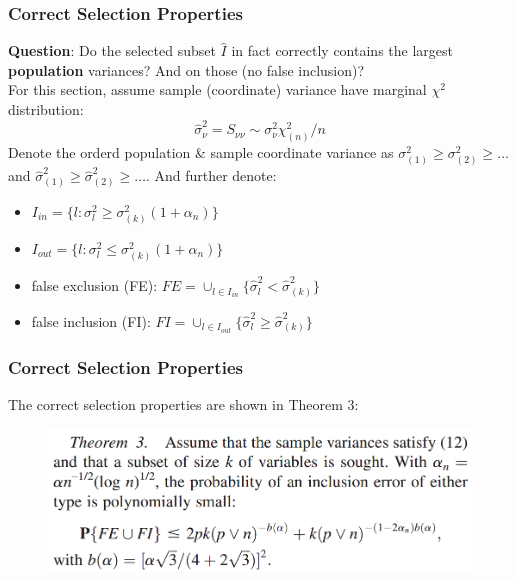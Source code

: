 \documentclass{beamer}
\begin{document}
	\begin{frame}
		\frametitle{Correct Selection Properties}
		\textbf{Question}: Do the selected subset $\hat{I}$ in fact correctly contains the largest \textbf{population} variances? And on those (no false inclusion)?\\
		For this section, assume sample (coordinate) variance have marginal $\chi^2$ distribution:
		$$\hat{\sigma}^2_{\nu} = S_{\nu\nu}\sim \sigma^2_{\nu}\chi^2_{(n)}/n$$
		Denote the orderd population \& sample coordinate variance as $\sigma^2_{(1)}\geq \sigma^2_{(2)}\geq\ldots$ and $\hat{\sigma}^2_{(1)}\geq \hat{\sigma}^2_{(2)}\geq\ldots$. And further denote:
		\begin{itemize}
			\item
			$I_{in} = \{l:\sigma^2_l \geq \sigma^2_{(k)}(1+\alpha_n)\}$
			\item
			$I_{out} = \{l:\sigma^2_l \leq \sigma^2_{(k)}(1+\alpha_n)\}$
			\item
			false exclusion (FE): $FE = \cup_{l\in I_{in}} \{\hat{\sigma}^2_l < \hat{\sigma}^2_{(k)}\}$
			\item 
			false inclusion (FI): $FI = \cup_{l\in I_{out}} \{\hat{\sigma}^2_l \geq \hat{\sigma}^2_{(k)}\}$
		\end{itemize}
	\end{frame}
	
	\begin{frame}
		\frametitle{Correct Selection Properties}
		The correct selection properties are shown in Theorem 3:
		\begin{figure}
			\includegraphics[width=0.8\linewidth]{image007.png}
		\end{figure}
		
	\end{frame}
	
\end{document}
